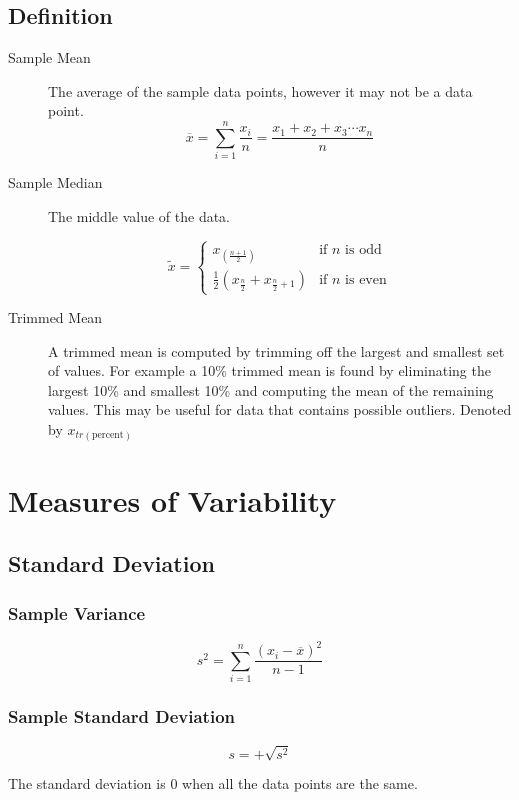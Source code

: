 \documentclass{book}
\begin{document}
\subsection{Definition}
\begin{description}
\item[Sample Mean] The average of the sample data points, however it may not be a data point.
$$\overline{x} = \sum_{i=1}^n\frac{x_i}{n} = \frac{x_1+x_2+x_3\cdots x_n}{n}$$
\item[Sample Median] The middle value of the data.

$$\tilde{x}=\left\{
\begin{matrix}
x_{(\frac{n+1}{2})} & \text{if $n$ is odd}\\
\frac{1}{2}(x_{\frac{n}{2}}+x_{\frac{n}{2}+1}) & \text{if $n$ is even}
\end{matrix}
\right.$$

\item[Trimmed Mean] A trimmed mean is computed by trimming off the largest and smallest set of values. For example a 10\% trimmed mean is found by eliminating the largest 10\% and smallest 10\% and computing the mean of the remaining values. This may be useful for data that contains possible outliers. Denoted by $x_{tr(\text{percent})}$
\end{description}

\section{Measures of Variability}

\subsection{Standard Deviation}

\subsubsection{Sample Variance}

$$s^2 = \sum_{i=1}^n \frac{(x_i - \overline{x})^2}{n-1}$$

\subsubsection{Sample Standard Deviation}

$$s=+\sqrt{s^2}$$

The standard deviation is $0$ when all the data points are the same.
\end{document}
